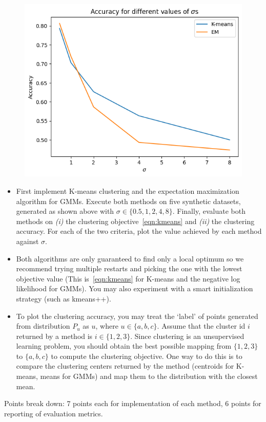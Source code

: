 \begin{soln}
\begin{figure}[H]
        \centering
        \includegraphics[scale=0.4]{Images/q12/q12_acc.png}
    \end{figure}
\end{soln}

\begin{itemize}
\item First implement K-means clustering and the expectation maximization algorithm for GMMs.
Execute both methods on five synthetic datasets,
generated as shown above with $\sigma \in \{0.5, 1, 2, 4, 8\}$. Finally, evaluate both methods on \emph{(i)} the clustering objective~\eqref{eqn:kmeans} and \emph{(ii)}  the clustering accuracy. For each of the two criteria, plot the value achieved by each method against $\sigma$.

\item Both algorithms are only guaranteed to find only a local optimum so we recommend trying multiple
restarts and picking the one with the lowest objective value (This is~\eqref{eqn:kmeans} for K-means and the negative log likelihood for GMMs).
You may also experiment with a smart initialization
strategy (such as kmeans++).

\item
To plot the clustering accuracy,  you may treat the `label' of points generated from distribution
$P_u$ as $u$, where $u\in \{a, b, c\}$.
Assume that the cluster id $i$ returned by a method is $i\in \{1, 2, 3\}$.
Since clustering is an unsupervised learning problem, you should obtain the best possible mapping
from $\{1, 2, 3\}$ to $\{a, b, c\}$ to compute the clustering objective.
One way to do this is to compare the clustering centers returned by the method (centroids for
K-means, means for GMMs) and map them to the distribution with the closest mean.

\end{itemize}

Points break down: 7 points each for implementation of each method, 6 points for reporting of
evaluation metrics.
